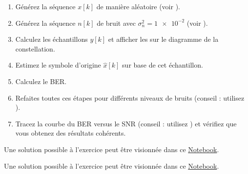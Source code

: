 \documentclass [a4paper, 11pt] {article}
\begin{document}
\begin{exercice}{1}
        \begin{enumerate}
            \item Générez la séquence $x[k]$ de manière aléatoire (voir \href{https://numpy.org/doc/stable/reference/random/generated/numpy.random.randint.html}{}).
            \item Générez la séquence $n[k]$ de bruit avec $\sigma_n^2 = \num{1e-2}$ (voir \href{https://numpy.org/doc/stable/reference/random/generated/numpy.random.randn.html}{}).
            \item Calculez les échantillons $y[k]$ et afficher les sur le diagramme de la constellation.
            \item Estimez le symbole d'origine $\hat{x}[k]$ sur base de cet échantillon.
            \item Calculez le BER.
            \item Refaites toutes ces étapes pour différents niveaux de bruits (conseil : utilisez ).
            \item Tracez la courbe du BER versus le SNR (conseil : utilisez ) et vérifiez que vous obtenez des résultats cohérents.
        \end{enumerate}
    
    \end{exercice}
    
    \begin{reponse}
        Une solution possible à l'exercice peut être visionnée dans ce \href{https://github.com/jeertmans/LELEC1930/blob/main/notebooks/seance4.ipynb}{Notebook}.
    \end{reponse}
    
    \begin{exercice}{2}
    
    \end{exercice}
    
    \begin{reponse}
        Une solution possible à l'exercice peut être visionnée dans ce \href{https://github.com/jeertmans/LELEC1930/blob/main/notebooks/seance4.ipynb}{Notebook}.
    \end{reponse}
\end{document}

